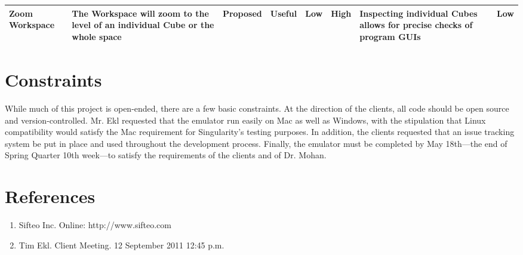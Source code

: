 \documentclass[12pt]{article}
\begin{document}
\begin{landscape}
\begin{table}[h]
\begin{tabular}{p{1.5in} | p{1.75in} | p{.75in} | p{.75in} | p{.75in} | p{.75in} | p{1.75in} | p{.6in}}
        Zoom Workspace &
        The Workspace will zoom to the level of an individual Cube or the whole space &
        Proposed &
        Useful &
        Low &
        High &
        Inspecting individual Cubes allows for precise checks of program \glspl{GUI}\index{GUI}\glsadd{GUIa} &
        Low \\ \hline

      \end{tabular}
    \end{table}
    \end{landscape}

\section{Constraints}
        While much of this project is open-ended, there are a few basic constraints. At the direction of the clients, all code should be \gls{open source} and version-controlled. Mr. Ekl requested that the emulator run easily on \gls{Mac} as well as \gls{Windows}, with the stipulation that \gls{Linux} compatibility would satisfy the \gls{Mac} requirement for Singularity's testing purposes. In addition, the clients requested that an \gls{issue tracking system} be put in place and used throughout the development process. Finally, the emulator must be completed by May 18th---the end of Spring Quarter 10th week---to satisfy the requirements of the clients and of Dr. Mohan.

\clearpage
{}
\printglossaries
\clearpage

\section*{References}

        \begin{enumerate}
                \item{Sifteo Inc. Online: http://www.sifteo.com}
                \item{Tim Ekl.  Client Meeting.  12 September 2011 12:45 p.m.}
        \end{enumerate}

\clearpage

\printindex
\end{document}
